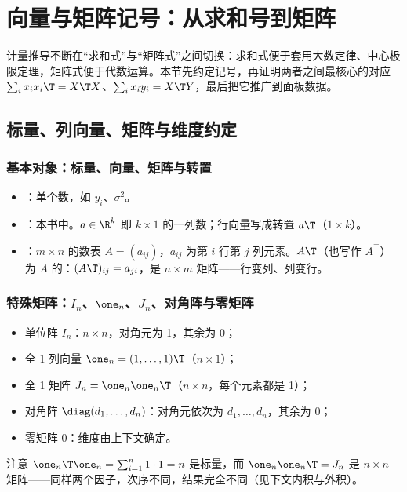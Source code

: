 \section{向量与矩阵记号：从求和号到矩阵}\label{sec:U01a-notation}

计量推导不断在“求和式”与“矩阵式”之间切换：求和式便于套用大数定律、中心极限定理，矩阵式便于代数运算。本节先约定记号，再证明两者之间最核心的对应 $\sum_i x_ix_i\T=X\T X$、$\sum_i x_iy_i=X\T Y$，最后把它推广到面板数据。

\subsection{标量、列向量、矩阵与维度约定}

\subsubsection{基本对象：标量、向量、矩阵与转置}

\begin{defn}[记号约定]\label{def:U01a-notation}
\begin{itemize}
  \item {}：单个数，如 $y_i$、$\sigma^2$。
  \item {}：本书中。$a\in\R^k$ 即 $k\times1$ 的一列数；行向量写成转置 $a\T$（$1\times k$）。
  \item {}：$m\times n$ 的数表 $A=(a_{ij})$，$a_{ij}$ 为第 $i$ 行第 $j$ 列元素。$A\T$（也写作 $A^{\top}$）为 $A$ 的：$(A\T)_{ij}=a_{ji}$，是 $n\times m$ 矩阵——行变列、列变行。
\end{itemize}
\end{defn}

\subsubsection{特殊矩阵：\texorpdfstring{$I_n$、$\one_n$、$J_n$}{I, 1, J}、对角阵与零矩阵}

\begin{itemize}
  \item 单位阵 $I_n$：$n\times n$，对角元为 1，其余为 0；
  \item 全 1 列向量 $\one_n=(1,\dots,1)\T$（$n\times 1$）；
  \item 全 1 矩阵 $J_n=\one_n\one_n\T$（$n\times n$，每个元素都是 1）；
  \item 对角阵 $\diag(d_1,\dots,d_n)$：对角元依次为 $d_1,\dots,d_n$，其余为 0；
  \item 零矩阵 $0$：维度由上下文确定。
\end{itemize}
注意 $\one_n\T\one_n=\sum_{i=1}^n 1\cdot 1=n$ 是标量，而 $\one_n\one_n\T=J_n$ 是 $n\times n$ 矩阵——同样两个因子，次序不同，结果完全不同（见下文内积与外积）。

